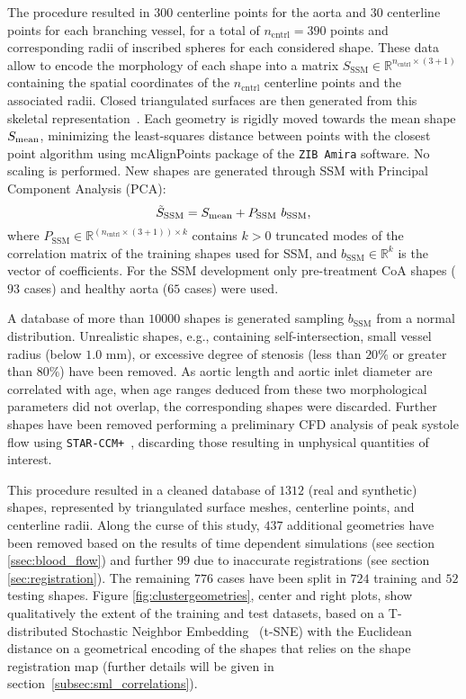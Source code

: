 The procedure resulted in $300$ centerline points for the aorta and $30$ centerline points for each branching vessel, for a total of $n_{\text{cntrl}}=390$ points and corresponding radii of inscribed spheres for each considered shape.
These data allow to encode the morphology of each shape into a matrix $S_{\text{SSM}}\in\mathbb{R}^{n_{\text{cntrl}}\times (3+1)}$ containing the spatial coordinates of the $n_{\text{cntrl}}$ centerline points and the associated radii. Closed triangulated surfaces are then generated from this skeletal representation~\cite{yevtushenko2021deep}. 
Each geometry is rigidly moved towards the mean shape $S_{\rm mean}$, %
minimizing the least-squares distance between points with the closest point algorithm using \textsf{mcAlignPoints} package of the \texttt{ZIB Amira} software.
%
No scaling is performed. New shapes 
are generated through SSM with Principal Component Analysis (PCA):
\begin{equation*}
  \Tilde{S}_{\text{SSM}} = S_{\rm mean}  + P_{\text{SSM}}\ b_{\text{SSM}}, 
\end{equation*}
where $P_{\text{SSM}}\in\mathbb{R}^{(n_{\text{cntrl}}\times (3+1))\times k}$ contains $k>0$ truncated modes of the correlation matrix of the training shapes used for SSM, and 
$b_{\text{SSM}}\in\mathbb{R}^k$ is the vector of coefficients. For the SSM development only pre-treatment CoA shapes ($93$ cases) and healthy aorta ($65$ cases) were used.


A database of more than $10000$ shapes is generated sampling $b_{\text{SSM}}$ from a normal distribution. Unrealistic shapes, e.g., containing self-intersection, small vessel radius (below $1.0$ mm), or 
excessive degree of stenosis (less than $20\%$ or greater than $80\%$) have been removed. 
%
As aortic length and aortic inlet diameter are correlated with age, when age ranges deduced from these two morphological parameters did not overlap, the corresponding shapes were discarded. Further shapes have been removed performing a preliminary CFD analysis of peak systole flow using \texttt{STAR-CCM+}~\cite{yevtushenko2021deep}, discarding 
those resulting in unphysical quantities of interest.

This procedure resulted in a cleaned database of $1312$ (real and synthetic) shapes, represented by triangulated surface meshes, centerline points, and centerline radii.
Along the curse of this study, $437$ additional geometries have been removed based on the results of time dependent simulations (see section \ref{ssec:blood_flow}) and further $99$ due to 
inaccurate registrations (see section \ref{sec:registration}). The remaining $776$ cases have been split in $724$ training and $52$ testing shapes.
Figure \ref{fig:clustergeometries}, center and right plots, show qualitatively the extent of the training and test datasets, based on a 
T-distributed Stochastic Neighbor Embedding~\cite{van2008visualizing} (t-SNE) with the Euclidean distance on a geometrical encoding of the shapes
that relies on the shape registration map (further details will be given in section~\ref{subsec:sml_correlations}).


